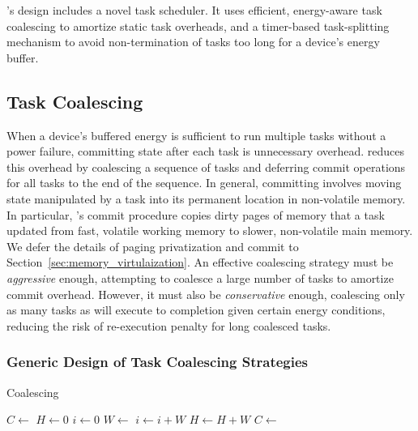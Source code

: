 \sys's design includes a novel task scheduler. It uses efficient, energy-aware task coalescing to amortize static task overheads, and a timer-based task-splitting mechanism to avoid non-termination of tasks too long for a device's energy buffer. 

\subsection{Task Coalescing}
\label{sec:task_coalescing}

When a device's buffered energy is sufficient to run multiple tasks without a power failure, committing state after each task is unnecessary overhead. \sys reduces this overhead by coalescing a sequence of tasks and deferring commit
operations for all tasks to the end of the sequence. In general, committing involves moving state manipulated by a task into its permanent location in non-volatile memory. In particular, \sys's commit procedure copies dirty pages of memory that a task updated from fast, volatile working memory to slower, non-volatile main memory. We defer the details of paging privatization and commit to Section~\ref{sec:memory_virtulaization}.
An effective coalescing strategy must be {\em aggressive} enough, attempting to coalesce a large number of tasks to amortize commit overhead.
However, it must also be  {\em conservative} enough, coalescing only as many tasks as will execute to completion given certain energy conditions, reducing the risk of re-execution penalty for long coalesced tasks.

\subsubsection{Generic Design of Task Coalescing Strategies}
\label{subsec:coalescingGeneral}

\begin{algorithm}[t]
	\caption{Coalescing}
	\label{algo:genCoalescing}
	\small
	\begin{algorithmic}[1]
        \State $C \leftarrow $  
        \State $H \gets 0$ 
	        \State $ i \gets 0$
		        \State {}
		        \State $W \leftarrow $  
		        \State $i \gets i + W$
				\State $H \gets H + W$
	        \EndWhile
	        \State {}
                \State $C \leftarrow $  
        \EndWhile
	\end{algorithmic}
\end{algorithm}

